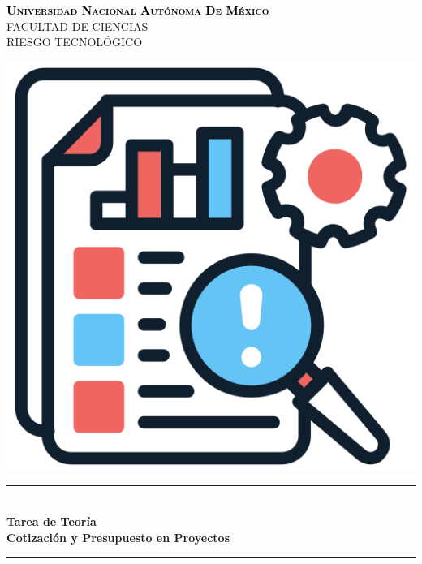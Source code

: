 \documentclass[12pt]{article}
\begin{document}
\begin{titlepage}
\begin{center}

\textsc{\Large \textcolor{black}{\textbf{Universidad Nacional Autónoma De México}}}\\[0.4cm]	

{\huge \Large \uppercase{Facultad de Ciencias} \\[0.4cm] }
{\huge \Large \uppercase{Riesgo Tecnológico} \\[1cm] }

\includegraphics[scale=0.45]{images/TR.png}\\[1cm]


\rule{\linewidth}{0.7mm} \\[0.4cm]
{ \huge \bfseries\color{cyan!70!black} Tarea de Teoría \\[0.3cm] }
{ \huge \bfseries\color{black} Cotización y Presupuesto en Proyectos \\[0.3cm] }
\rule{\linewidth}{0.7mm} \\[1cm]


\\[0.4cm]


\end{center}
\end{titlepage}
\end{document}
